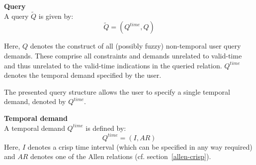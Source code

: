 \begin{svgraybox}
\vspace{-10pt}
\begin{definition}
\textbf{Query}\\
A query $\tilde{Q}$ is given by:
\begin{equation}
\label{eq:query-specification}
\tilde{Q} = \left( Q^{time}, Q \right)
\end{equation}

Here, $Q$ denotes the construct of all (possibly fuzzy) non-temporal user query demands. These comprise all constraints and demands unrelated to valid-time and thus unrelated to the valid-time indications in the queried relation. $Q^{time}$ denotes the temporal demand specified by the user.

\end{definition}
\vspace{-10pt}
\end{svgraybox}

The presented query structure allows the user to specify a single temporal demand, denoted by $Q^{time}$.

\begin{svgraybox}
\vspace{-10pt}
\begin{definition}
\textbf{Temporal demand}\\
A temporal demand $Q^{time}$ is defined by:
\begin{equation}
Q^{time} = \left( I,AR \right)
\end{equation}
Here, $I$ denotes a crisp time interval (which can be specified in any way required) and $AR$ denotes one of the Allen relations (cf. section~\ref{allen-crisp}).
\end{definition}
\vspace{-10pt}
\end{svgraybox}

